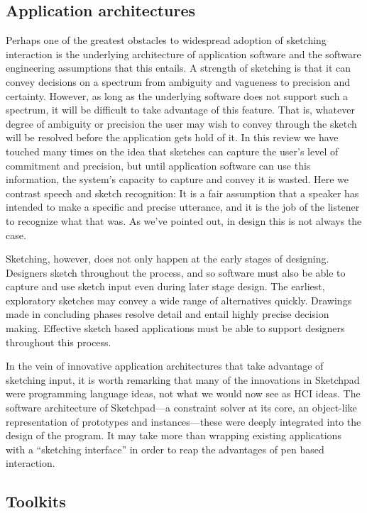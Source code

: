 \subsection{Application architectures}

Perhaps one of the greatest obstacles to widespread adoption of
sketching interaction is the underlying architecture of application
software and the software engineering assumptions that this entails. A
strength of sketching is that it can convey decisions on a spectrum
from ambiguity and vagueness to precision and certainty. However, as
long as the underlying software does not support such a spectrum, it
will be difficult to take advantage of this feature. That is, whatever
degree of ambiguity or precision the user may wish to convey through
the sketch will be resolved before the application gets hold of it. In
this review we have touched many times on the idea that sketches can
capture the user's level of commitment and precision, but until
application software can use this information, the system's capacity
to capture and convey it is wasted. Here we contrast speech and sketch
recognition: It is a fair assumption that a speaker has intended to
make a specific and precise utterance, and it is the job of the
listener to recognize what that was. As we've pointed out, in design
this is not always the case.

Sketching, however, does not only happen at the early stages of
designing. Designers sketch throughout the process, and so software
must also be able to capture and use sketch input even during later
stage design. The earliest, exploratory sketches may convey a wide
range of alternatives quickly. Drawings made in concluding phases
resolve detail and entail highly precise decision making.  Effective
sketch based applications must be able to support designers throughout
this process. 

In the vein of innovative application architectures that take
advantage of sketching input, it is worth remarking that many of the
innovations in Sketchpad were programming language ideas, not what we
would now see as HCI ideas. The software architecture of Sketchpad---a
constraint solver at its core, an object-like representation of
prototypes and instances---these were deeply integrated into the
design of the program. It may take more than wrapping existing
applications with a ``sketching interface'' in order to reap the
advantages of pen based interaction.

\subsection{Toolkits}

